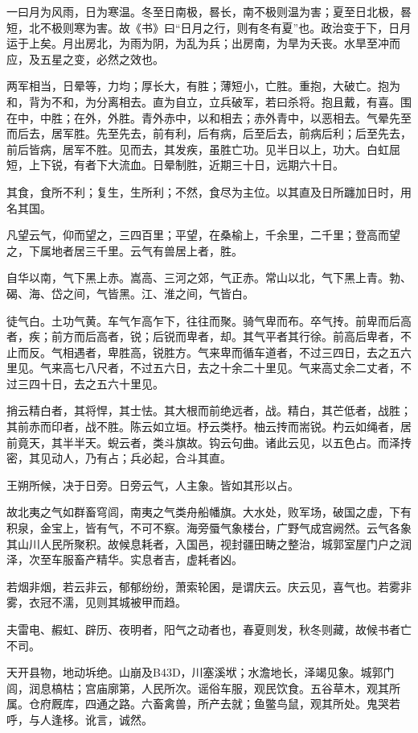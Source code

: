 \documentclass[]{article}
\begin{document}
一曰月为风雨，日为寒温。冬至日南极，晷长，南不极则温为害；夏至日北极，晷短，北不极则寒为害。故《书》曰``日月之行，则有冬有夏''也。政治变于下，日月运于上矣。月出房北，为雨为阴，为乱为兵；出房南，为旱为夭丧。水旱至冲而应，及五星之变，必然之效也。

两军相当，日晕等，力均；厚长大，有胜；薄短小，亡胜。重抱，大破亡。抱为和，背为不和，为分离相去。直为自立，立兵破军，若曰杀将。抱且戴，有喜。围在中，中胜；在外，外胜。青外赤中，以和相去；赤外青中，以恶相去。气晕先至而后去，居军胜。先至先去，前有利，后有病，后至后去，前病后利；后至先去，前后皆病，居军不胜。见而去，其发疾，虽胜亡功。见半日以上，功大。白虹屈短，上下锐，有者下大流血。日晕制胜，近期三十日，远期六十日。

其食，食所不利；复生，生所利；不然，食尽为主位。以其直及日所躔加日时，用名其国。

凡望云气，仰而望之，三四百里；平望，在桑榆上，千余里，二千里；登高而望之，下属地者居三千里。云气有兽居上者，胜。

自华以南，气下黑上赤。嵩高、三河之郊，气正赤。常山以北，气下黑上青。勃、碣、海、岱之间，气皆黑。江、淮之间，气皆白。

徒气白。土功气黄。车气乍高乍下，往往而聚。骑气卑而布。卒气抟。前卑而后高者，疾；前方而后高者，锐；后锐而卑者，却。其气平者其行徐。前高后卑者，不止而反。气相遇者，卑胜高，锐胜方。气来卑而循车道者，不过三四日，去之五六里见。气来高七八尺者，不过五六日，去之十余二十里见。气来高丈余二丈者，不过三四十日，去之五六十里见。

捎云精白者，其将悍，其士怯。其大根而前绝远者，战。精白，其芒低者，战胜；其前赤而印者，战不胜。陈云如立垣。杼云类杼。柚云抟而耑锐。杓云如绳者，居前竟天，其半半天。蜺云者，类斗旗故。钩云句曲。诸此云见，以五色占。而泽抟密，其见动人，乃有占；兵必起，合斗其直。

王朔所候，决于日旁。日旁云气，人主象。皆如其形以占。

故北夷之气如群畜穹闾，南夷之气类舟船幡旗。大水处，败军场，破国之虚，下有积泉，金宝上，皆有气，不可不察。海旁蜃气象楼台，广野气成宫阙然。云气各象其山川人民所聚积。故候息耗者，入国邑，视封疆田畴之整治，城郭室屋门户之润泽，次至车服畜产精华。实息者吉，虚耗者凶。

若烟非烟，若云非云，郁郁纷纷，萧索轮囷，是谓庆云。庆云见，喜气也。若雾非雾，衣冠不濡，见则其城被甲而趋。

夫雷电、赮虹、辟历、夜明者，阳气之动者也，春夏则发，秋冬则藏，故候书者亡不司。

天开县物，地动坼绝。山崩及B43D，川塞溪垘；水澹地长，泽竭见象。城郭门闾，润息槁枯；宫庙廓第，人民所次。谣俗车服，观民饮食。五谷草木，观其所属。仓府厩库，四通之路。六畜禽兽，所产去就；鱼鳖鸟鼠，观其所处。鬼哭若呼，与人逢栘。讹言，诚然。
\end{document}
